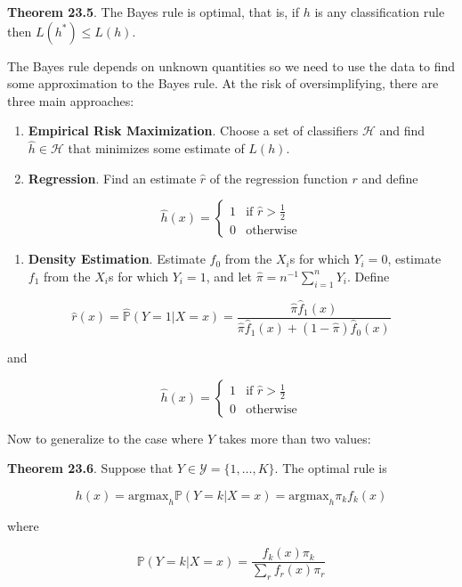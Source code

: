 \textbf{Theorem 23.5}. The Bayes rule is optimal, that is, if \(h\) is
any classification rule then \(L(h^*) \leq L(h)\).

The Bayes rule depends on unknown quantities so we need to use the data
to find some approximation to the Bayes rule. At the risk of
oversimplifying, there are three main approaches:

\begin{enumerate}
\def\labelenumi{\arabic{enumi}.}
\item
  \textbf{Empirical Risk Maximization}. Choose a set of classifiers
  \(\mathcal{H}\) and find \(\hat{h} \in \mathcal{H}\) that minimizes
  some estimate of \(L(h)\).
\item
  \textbf{Regression}. Find an estimate \(\hat{r}\) of the regression
  function \(r\) and define
\end{enumerate}

\[ 
\hat{h}(x) = \begin{cases}
1 & \text{if } \hat{r} > \frac{1}{2} \\
0 & \text{otherwise}
\end{cases}
\]

\begin{enumerate}[tightlist,label={\arabic*.},resume]
\item
  \textbf{Density Estimation}. Estimate \(f_{0}\) from the \(X_{i}\)s for
  which \(Y_{i} = 0\), estimate \(f_{1}\) from the \(X_{i}\)s for which
  \(Y_{i} = 1\), and let \(\hat{\pi} = n^{-1} \sum_{i=1}^{n} Y_{i}\). Define
\end{enumerate}

\[ \hat{r}(x) = \hat{\mathbb{P}}(Y = 1 | X = x) = \frac{\hat{\pi} \hat{f}_{1}(x)}{\hat{\pi} \hat{f}_{1}(x) + (1 - \hat{\pi}) \hat{f}_{0}(x)} \]

and

\[ 
\hat{h}(x) = \begin{cases}
1 & \text{if } \hat{r} > \frac{1}{2} \\
0 & \text{otherwise}
\end{cases}
\]

Now to generalize to the case where \(Y\) takes more than two values:

\textbf{Theorem 23.6}. Suppose that
\(Y \in \mathcal{Y} = \{ 1, \dots, K \}\). The optimal rule is

\[ h(x) = \text{argmax}_h \mathbb{P}(Y = k | X = x) = \text{argmax}_h \pi_{k} f_{k}(x) \]

where

\[ \mathbb{P}(Y = k | X = x) = \frac{f_{k}(x) \pi_{k}}{\sum_r f_r(x) \pi_r} \]


